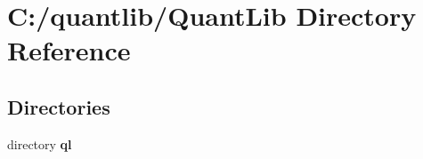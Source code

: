 \section{C\+:/quantlib/\+Quant\+Lib Directory Reference}
\label{dir_094ff217341aa2137febd6b4794ce3e6}
\subsection*{Directories}
\begin{DoxyCompactItemize}
\item 
directory {\bf ql}
\end{DoxyCompactItemize}
